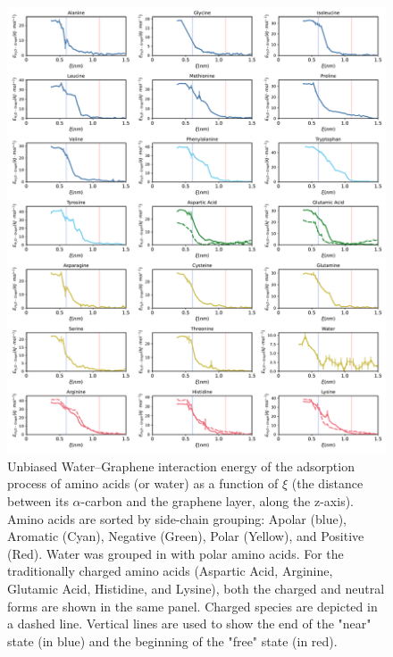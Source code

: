 \documentclass[9pt]{article}
\begin{document}
\begin{figure}[hbtp]
    \centering
    \includegraphics[width=\textwidth]{FigS6.pdf}
    \caption{Unbiased Water--Graphene interaction energy of the adsorption process of amino acids (or water) as a function of $\xi$ (the distance between its $\alpha$-carbon and the graphene layer, along the z-axis). Amino acids are sorted by side-chain grouping: Apolar (blue), Aromatic (Cyan), Negative (Green), Polar (Yellow), and Positive (Red). Water was grouped in with polar amino acids. For the traditionally charged amino acids (Aspartic Acid, Arginine, Glutamic Acid,  Histidine, and Lysine), both the charged and neutral forms are shown in the same panel. Charged species are depicted in a dashed line. Vertical lines are used to show the end of the "near" state (in blue) and the beginning of the "free" state (in red).}
    \label{fig:EnergyW-G}
\end{figure}
\end{document}
